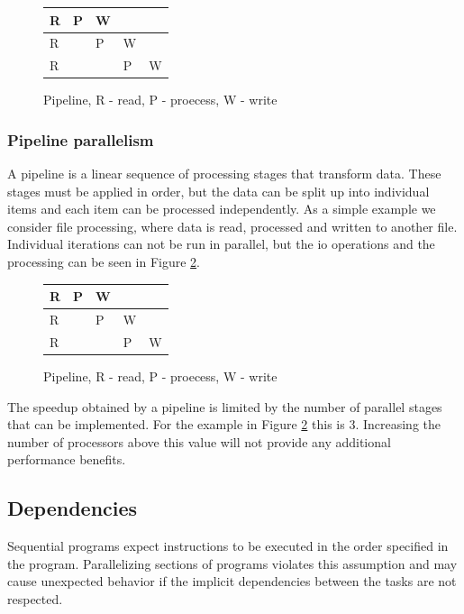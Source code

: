 \begin{figure}[!ht]
	\centering
	\begin{tabular}{ l | l | l | l | l}
		R & P & W & & \\
		\hline
		R &  & P & W & \\
		\hline
		R &  & & P & W \\
	\end{tabular}
	\caption{Pipeline, R - read, P - proecess, W - write}
	\label{cap2:datapar}
\end{figure}

\subsubsection{Pipeline parallelism}

A pipeline \cite{parbook} is a linear sequence of processing stages that transform data. These stages must be applied in order, but the data can be split up into individual items and each item can be processed independently. As a simple example we consider file processing, where data is read, processed and written to another file. Individual iterations can not be run in parallel, but the io operations and the processing can be seen in Figure \ref{cap2:pipeline}.

\begin{figure}[!ht]
	\centering
	\begin{tabular}{ l | l | l | l | l}
		R & P & W & & \\
		\hline
		R &  & P & W & \\
		\hline
		R &  & & P & W \\
	\end{tabular}
	\caption{Pipeline, R - read, P - proecess, W - write}
	\label{cap2:pipeline}
\end{figure}

The speedup obtained by a pipeline is limited by the number of parallel stages that can be implemented. For the example in Figure \ref{cap2:pipeline} this is 3. Increasing the number of processors above this value will not provide any additional performance benefits.

\subsection{Dependencies}

Sequential programs expect instructions to be executed in the order specified in the program. Parallelizing sections of programs violates this assumption and may cause unexpected behavior if the implicit dependencies between the tasks are not respected.

